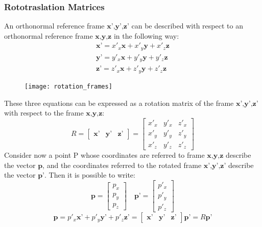 \subsubsection{Rototraslation Matrices}
An orthonormal reference frame $\textbf{x’,y’,z’}$ can be described with respect to an orthonormal reference frame $\textbf{x,y,z}$ in the following way:
\begin{align}
\textbf{x'}=x'_x\textbf{x}+x'_y\textbf{y}+x'_z\textbf{z}\\
\textbf{y'}=y'_x\textbf{x}+y'_y\textbf{y}+y'_z\textbf{z}\\
\textbf{z'}=z'_x\textbf{x}+z'_y\textbf{y}+z'_z\textbf{z}
\end{align}
\begin{figure}[h!]
	\centering
	\texttt{[image: rotation\_frames]}
	\caption{}
\end{figure}
These three equations can be expressed as a rotation matrix of the frame $\textbf{x’,y’,z’}$ with respect to the frame $\textbf{x,y,z}$:
\begin{equation}
R= \left[
\begin{matrix}
\textbf{x'} & \textbf{y'} & \textbf{z'}
\end{matrix}
\right]=\left[
\begin{matrix}
x'_x & y'_x & z'_x \\
x'_y & y'_y & z'_y \\
x'_z & y'_z & z'_z 
\end{matrix}
\right] 	
\end{equation}
Consider now a point P whose coordinates are referred to frame $\textbf{x,y,z}$ describe the vector $\textbf{p}$, and the coordinates referred to the rotated frame $\textbf{x’,y’,z’}$ describe the vector $\textbf{p’}$. Then it is possible to write:
\begin{equation}
	\textbf{p} = \left[
	\begin{matrix}
		p_x \\ p_y \\ p_z
	\end{matrix}
	\right]
	\quad
	\textbf{p'} = \left[
	\begin{matrix}
		p'_x \\ p'_y \\ p'_z
	\end{matrix}
	\right]
\end{equation}
\begin{equation}
	\textbf{p} = p'_x\textbf{x'}+p'_y\textbf{y'}+p'_z\textbf{z'}=\left[
	\begin{matrix}
		\textbf{x'} & \textbf{y'} & \textbf{z'}
	\end{matrix}
	\right] \textbf{p'} = R \textbf{p'}
\end{equation}
